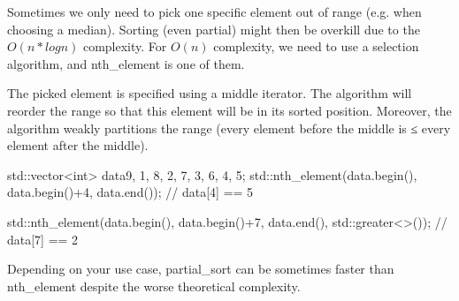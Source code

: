 Sometimes we only need to pick one specific element out of range (e.g. when choosing a median). Sorting (even partial) might then be overkill due to the $O(n*logn)$ complexity. For $O(n)$ complexity, we need to use a selection algorithm, and nth\_element is one of them.



The picked element is specified using a middle iterator. The algorithm will reorder the range so that this element will be in its sorted position. Moreover, the algorithm weakly partitions the range (every element before the middle is ≤ every element after the middle).

\begin{box-note}
\begin{cppcode}
std::vector<int> data{9, 1, 8, 2, 7, 3, 6, 4, 5};
std::nth_element(data.begin(), data.begin()+4, data.end());
// data[4] == 5

std::nth_element(data.begin(), data.begin()+7, data.end(), std::greater<>());
// data[7] == 2
\end{cppcode}
\end{box-note}

Depending on your use case, partial\_sort can be sometimes faster than nth\_element despite the worse theoretical complexity.